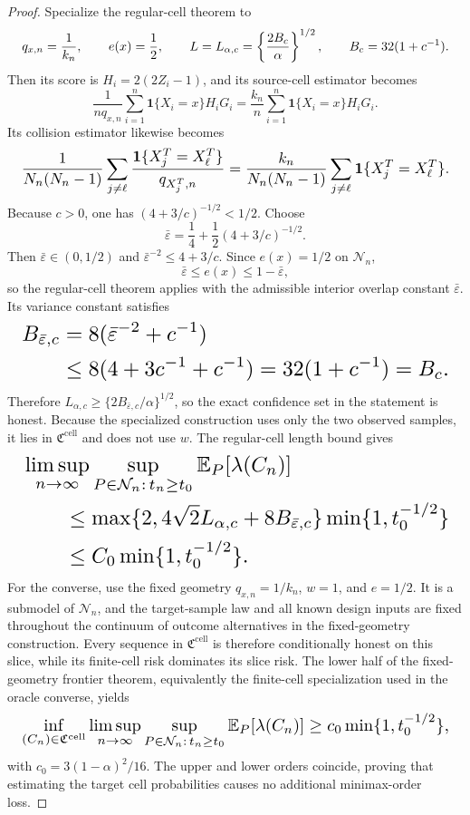 \documentclass{article}
\begin{document}
\begin{proof}
Specialize the regular-cell theorem to
\[
\makebox[\linewidth][c]{\resizebox{0.98\linewidth}{!}{\(\displaystyle q_{x,n}=\frac1{k_n},
 \qquad e(x)=\frac12,
 \qquad
 L=L_{\alpha,c}=\left\{\frac{2B_c}{\alpha}\right\}^{1/2},
 \qquad B_c=32(1+c^{-1}).\)}}
\]
Then its score is \(H_i=2(2Z_i-1)\), and its source-cell estimator becomes
\[
 \frac1{nq_{x,n}}\sum_{i=1}^n\mathbf 1\{X_i=x\}H_iG_i
 =\frac{k_n}{n}\sum_{i=1}^n\mathbf 1\{X_i=x\}H_iG_i.
\]
Its collision estimator likewise becomes
\[
\makebox[\linewidth][c]{\resizebox{0.98\linewidth}{!}{\(\displaystyle \frac1{N_n(N_n-1)}\sum_{j\ne\ell}
 \frac{\mathbf 1\{X_j^T=X_\ell^T\}}{q_{X_j^T,n}}
 =\frac{k_n}{N_n(N_n-1)}\sum_{j\ne\ell}
 \mathbf 1\{X_j^T=X_\ell^T\}.\)}}
\]
Because \(c>0\), one has \((4+3/c)^{-1/2}<1/2\). Choose
\[
 \bar\varepsilon=\frac14+\frac12(4+3/c)^{-1/2}.
\]
Then \(\bar\varepsilon\in(0,1/2)\) and \(\bar\varepsilon^{-2}\le 4+3/c\). Since \(e(x)=1/2\) on \(\mathcal N_n\),
\[
 \bar\varepsilon\le e(x)\le1-\bar\varepsilon,
\]
so the regular-cell theorem applies with the admissible interior overlap constant \(\bar\varepsilon\). Its variance constant satisfies
\[
\makebox[\linewidth][c]{\resizebox{0.98\linewidth}{!}{\(\displaystyle \begin{aligned}
 B_{\bar\varepsilon,c}
 &=8(\bar\varepsilon^{-2}+c^{-1})\\
 &\le8(4+3c^{-1}+c^{-1})
 =32(1+c^{-1})=B_c.
 \end{aligned}\)}}
\]
Therefore \(L_{\alpha,c}\ge\{2B_{\bar\varepsilon,c}/\alpha\}^{1/2}\), so the exact confidence set in the statement is honest. Because the specialized construction uses only the two observed samples, it lies in \(\mathfrak C^{\mathrm{cell}}\) and does not use \(w\). The regular-cell length bound gives
\[
\makebox[\linewidth][c]{\resizebox{0.98\linewidth}{!}{\(\displaystyle \begin{aligned}
 &\limsup_{n\to\infty}
 \sup_{P\in\mathcal N_n:\,t_n\ge t_0}
 \mathbb E_P[\lambda(C_n)]\\
 &\qquad\le
 \max\{2,4\sqrt2L_{\alpha,c}+8B_{\bar\varepsilon,c}\}
 \min\{1,t_0^{-1/2}\}\\
 &\qquad\le C_0\min\{1,t_0^{-1/2}\}.
 \end{aligned}\)}}
\]
For the converse, use the fixed geometry \(q_{x,n}=1/k_n\), \(w=1\), and \(e=1/2\). It is a submodel of \(\mathcal N_n\), and the target-sample law and all known design inputs are fixed throughout the continuum of outcome alternatives in the fixed-geometry construction. Every sequence in \(\mathfrak C^{\mathrm{cell}}\) is therefore conditionally honest on this slice, while its finite-cell risk dominates its slice risk. The lower half of the fixed-geometry frontier theorem, equivalently the finite-cell specialization used in the oracle converse, yields
\[
\makebox[\linewidth][c]{\resizebox{0.98\linewidth}{!}{\(\displaystyle \inf_{(C_n)\in\mathfrak C^{\mathrm{cell}}}
 \limsup_{n\to\infty}
 \sup_{P\in\mathcal N_n:\,t_n\ge t_0}
 \mathbb E_P[\lambda(C_n)]
 \ge c_0\min\{1,t_0^{-1/2}\},\)}}
\]
with \(c_0=3(1-\alpha)^2/16\). The upper and lower orders coincide, proving that estimating the target cell probabilities causes no additional minimax-order loss.
\end{proof}
\end{document}
